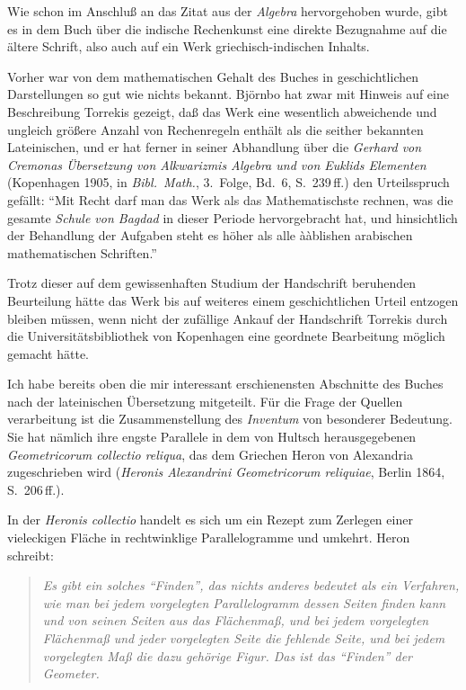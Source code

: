 \documentclass[11pt,a4paper]{article}
\newcommand{\enquote}[1]{``#1''}
\begin{document}
Wie schon im Anschlu\ss{} an das Zitat aus der \textit{Algebra} hervorgehoben wurde, gibt es in dem Buch \"uber die indische Rechenkunst eine direkte Bezugnahme auf die \"altere Schrift, also auch auf ein Werk griechisch-indischen Inhalts.

Vorher war von dem mathematischen Gehalt des Buches in geschichtlichen Darstellungen so gut wie nichts bekannt. Bj\"ornbo hat zwar mit Hinweis auf eine Beschreibung Torrekis gezeigt, da\ss{} das Werk eine wesentlich abweichende und ungleich gr\"o\ss{}ere Anzahl von Rechenregeln enth\"alt als die seither bekannten Lateinischen, und er hat ferner in seiner Abhandlung \"uber die \textit{Gerhard von Cremonas \"Ubersetzung von Alkwarizmis Algebra und von Euklids Elementen} (Kopenhagen 1905, in \textit{Bibl.\ Math.}, 3.\ Folge, Bd.\ 6, S.\ 239\,ff.) den Urteilsspruch gef\"allt: \enquote{Mit Recht darf man das Werk als das Mathematischste rechnen, was die gesamte \textit{Schule von Bagdad} in dieser Periode hervorgebracht hat, und hinsichtlich der Behandlung der Aufgaben steht es h\"oher als alle \`a\`ablishen arabischen mathematischen Schriften.}

Trotz dieser auf dem gewissenhaften Studium der Handschrift beruhenden Beurteilung h\"atte das Werk bis auf weiteres einem geschichtlichen Urteil entzogen bleiben m\"ussen, wenn nicht der zuf\"allige Ankauf der Handschrift Torrekis durch die Universit\"atsbibliothek von Kopenhagen eine geordnete Bearbeitung m\"oglich gemacht h\"atte.

Ich habe bereits oben die mir interessant erschienensten Abschnitte des Buches nach der lateinischen \"Ubersetzung mitgeteilt. F\"ur die Frage der Quellen verarbeitung ist die Zusammenstellung des \textit{Inventum} von besonderer Bedeutung. Sie hat n\"amlich ihre engste Parallele in dem von Hultsch herausgegebenen \textit{Geometricorum collectio reliqua}, das dem Griechen Heron von Alexandria zugeschrieben wird (\textit{Heronis Alexandrini Geometricorum reliquiae}, Berlin 1864, S.\ 206\,ff.).

In der \textit{Heronis collectio} handelt es sich um ein Rezept zum Zerlegen einer vieleckigen Fl\"ache in rechtwinklige Parallelogramme und umkehrt. Heron schreibt:

\begin{quote}
\textit{Es gibt ein solches \enquote{Finden}, das nichts anderes bedeutet als ein Verfahren, wie man bei jedem vorgelegten Parallelogramm dessen Seiten finden kann und von seinen Seiten aus das Fl\"achenma\ss{}, und bei jedem vorgelegten Fl\"achenma\ss{} und jeder vorgelegten Seite die fehlende Seite, und bei jedem vorgelegten Ma\ss{} die dazu geh\"orige Figur. Das ist das \enquote{Finden} der Geometer.}
\end{quote}
\end{document}
